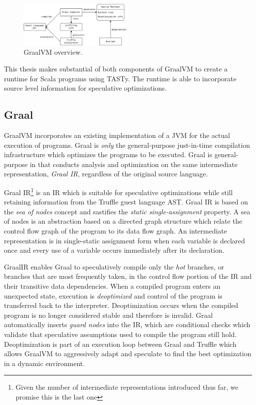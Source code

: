 \begin{figure}[!htb]
	\centering
	\includegraphics[width=0.5\textwidth]{figures/graalvm-pipeline.png}
	\caption{GraalVM overview\cite{graalvm:ir}.}
\end{figure}

This thesis makes substantial of both components of GraalVM to create a runtime for Scala programs using TASTy.
The runtime is able to incorporate source level information for speculative optimizations.


\subsection{Graal}

GraalVM incorporates an existing implementation of a JVM\cite{java:hotspot} for the actual execution of programs.
Graal is \textit{only} the general-purpose just-in-time compilation infrastructure which optimizes the programs to be executed.
Graal is general-purpose in that conducts analysis and optimization on the same intermediate representation, \textit{Graal IR}, regardless of the original source language.

Graal IR\cite{graalvm:ir}\footnote{Given the number of intermediate representations introduced thus far, we promise this is the last one} is an IR which is suitable for speculative optimizations while still retaining information from the Truffle guest language AST.
Graal IR is based on the \textit{sea of nodes} concept\cite{click:sea-of-nodes} and sastifies the \textit{static single-assignment}\cite{ssa} property.
A sea of nodes is an abstraction based on a directed graph structure which relate the control flow graph\cite{allen:ctrl-flow-analysis} of the program to its data flow graph\cite{allen:data-flow-analysis}.
An intermediate representation is in single-static assignment form when each variable is declared once and every use of a variable occurs immediately after its declaration\cite{johnson:use-def-chains}.


GraalIR enables Graal to speculatively compile only the \textit{hot} branches\cite{graalvm:speculative-ir}, or branches that are most frequently taken, in the control flow portion of the IR and their transitive data dependencies.
When a compiled program enters an unexpected state, execution is \textit{deoptimized}\cite{self:deoptimization} and control of the program is transferred back to the interpreter.
Deoptimization occurs when the compiled program is no longer considered stable and therefore is invalid.
Graal automatically inserts \textit{guard nodes} into the IR, which are conditional checks which validate that speculative assumptions used to compile the program still hold.
Deoptimization is part of an execution loop between Graal and Truffle which allows GraalVM to aggressively adapt and speculate to find the best optimization in a dynamic environment.

